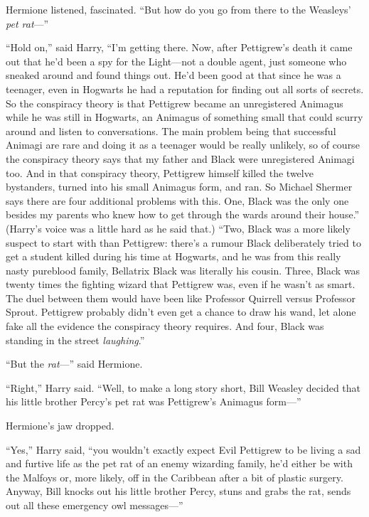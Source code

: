 Hermione listened, fascinated.
“But how do you go from there to the Weasleys’ \emph{pet rat}—”

“Hold on,” said Harry,
“I’m getting there. Now, after Pettigrew’s death it came out that he’d been a spy for the Light—not a double agent, just someone who sneaked around and found things out. He’d been good at that since he was a teenager, even in Hogwarts he had a reputation for finding out all sorts of secrets. So the conspiracy theory is that Pettigrew became an unregistered Animagus while he was still in Hogwarts, an Animagus of something small that could scurry around and listen to conversations. The main problem being that successful Animagi are rare and doing it as a teenager would be really unlikely, so of course the conspiracy theory says that my father and Black were unregistered Animagi too. And in that conspiracy theory, Pettigrew himself killed the twelve bystanders, turned into his small Animagus form, and ran. So Michael Shermer says there are four additional problems with this. One, Black was the only one besides my parents who knew how to get through the wards around their house.” (Harry’s voice was a little hard as he said that.)
“Two, Black was a more likely suspect to start with than Pettigrew: there’s a rumour Black deliberately tried to get a student killed during his time at Hogwarts, and he was from this really nasty pureblood family, Bellatrix Black was literally his cousin. Three, Black was twenty times the fighting wizard that Pettigrew was, even if he wasn’t as smart. The duel between them would have been like Professor Quirrell versus Professor Sprout. Pettigrew probably didn’t even get a chance to draw his wand, let alone fake all the evidence the conspiracy theory requires. And four, Black was standing in the street \emph{laughing}.”

“But the \emph{rat}—” said Hermione.

“Right,” Harry said.
“Well, to make a long story short, Bill Weasley decided that his little brother Percy’s pet rat was Pettigrew’s Animagus form—”

Hermione’s jaw dropped.

“Yes,” Harry said, “you wouldn’t exactly expect Evil Pettigrew to be living a sad and furtive life as the pet rat of an enemy wizarding family, he’d either be with the Malfoys or, more likely, off in the Caribbean after a bit of plastic surgery. Anyway, Bill knocks out his little brother Percy, stuns and grabs the rat, sends out all these emergency owl messages—”

